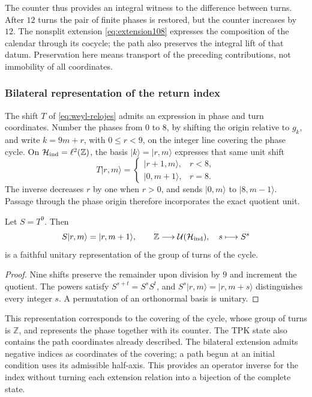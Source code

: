 The counter thus provides an integral witness to the difference between
turns. After \(12\) turns the pair of finite phases is restored, but the
counter increases by \(12\). The nonsplit extension
\eqref{eq:extension108} expresses the composition of the calendar through
its cocycle; the path also preserves the integral lift of that datum.
Preservation here means transport of the preceding contributions, not
immobility of all coordinates.

\subsubsection{Bilateral representation of the return index}

The shift \(T\) of \eqref{eq:weyl-relojes} admits an expression in
phase and turn coordinates. Number the phases from \(0\) to \(8\), by
shifting the origin relative to \(g_k\), and write \(k=9m+r\), with
\(0\leq r<9\), on the integer line covering the phase cycle. On
\(\mathcal H_{\rm ind}=\ell^2(\mathbb Z)\), the basis
\(|k\rangle=|r,m\rangle\) expresses that same unit shift
\[
 T|r,m\rangle=
 \begin{cases}
 |r+1,m\rangle,&r<8,\\
 |0,m+1\rangle,&r=8.
 \end{cases}
\]
The inverse decreases \(r\) by one when \(r>0\), and sends
\(|0,m\rangle\) to \(|8,m-1\rangle\). Passage through the phase origin
therefore incorporates the exact quotient unit.

\begin{proposition}
\label{mono-ampl:representacion}
Let \(S=T^9\). Then
\[
 S|r,m\rangle=|r,m+1\rangle,\qquad
 \mathbb Z\longrightarrow\mathcal U(\mathcal H_{\rm ind}),
 \quad s\longmapsto S^s
\]
is a faithful unitary representation of the group of turns of the cycle.
\end{proposition}
\begin{proof}
Nine shifts preserve the remainder upon division by \(9\) and increment
the quotient. The powers satisfy \(S^{s+t}=S^sS^t\), and
\(S^s|r,m\rangle=|r,m+s\rangle\) distinguishes every integer \(s\).
A permutation of an orthonormal basis is unitary.
\end{proof}

This representation corresponds to the covering of the cycle, whose group
of turns is \(\mathbb Z\), and represents the phase together with its
counter. The TPK state also contains the path coordinates already described.
The bilateral extension admits negative indices as coordinates of the
covering; a path begun at an initial condition uses its admissible half-axis.
This provides an operator inverse for the index without turning each
extension relation into a bijection of the complete state.


